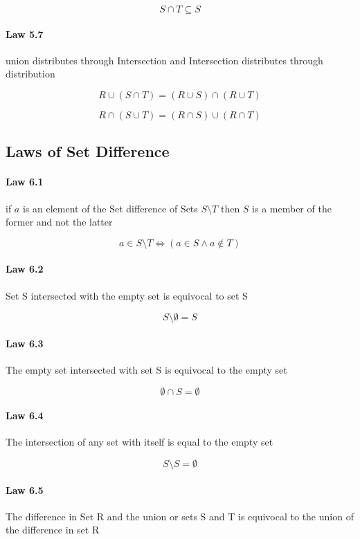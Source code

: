 \documentclass[twocolumn]{article}
\begin{document}
$$ S \cap T \subseteq S $$

\paragraph{Law 5.7} union distributes through Intersection and Intersection distributes through distribution

$$ R  \cup  (S  \cap  T) = (R  \cup  S)  \cap  (R  \cup  T) $$

$$ R  \cap  (S  \cup  T) = (R  \cap  S)  \cup  (R  \cap  T) $$

\subsection{Laws of Set Difference}

\paragraph{Law 6.1} if $a$ is an element of the Set difference of Sets $S \setminus T$ then $S$ is a member of the former and not the latter

$$ a  \in  S \setminus T \iff (a  \in  S \wedge a \not\in T) $$

\paragraph{Law 6.2} Set S intersected with the empty set is equivocal to set S

$$ S \setminus \emptyset  = S  $$

\paragraph{Law 6.3} The empty set intersected with set S is equivocal to the empty set

$$  \emptyset \cap S =  \emptyset  $$

\paragraph{Law 6.4} The intersection of any set with itself is equal to the empty set

$$ S \setminus S =  \emptyset  $$

\paragraph{Law 6.5} The difference in Set R and the union or sets S and T is equivocal to the union of the difference in set R
\end{document}
